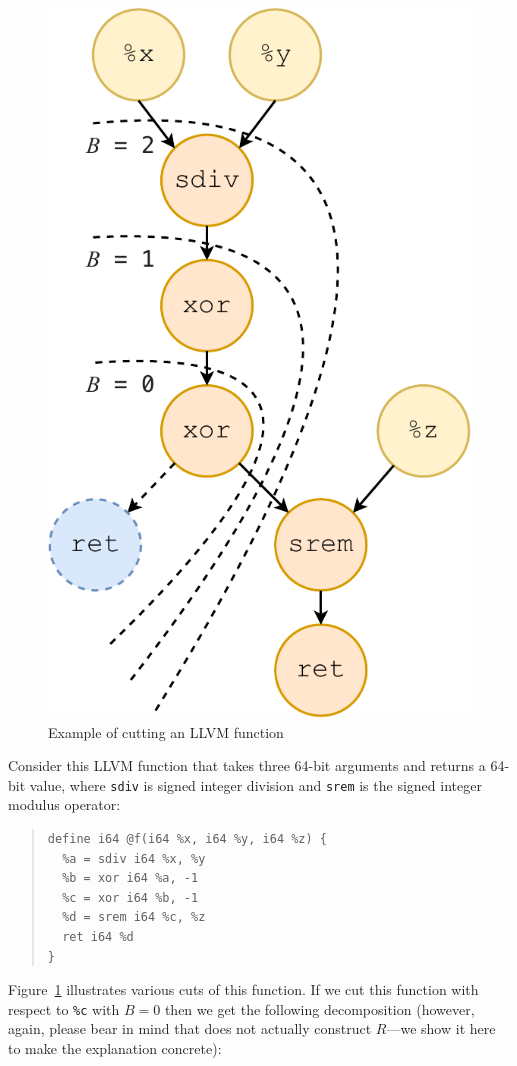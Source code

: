 \begin{figure}[tbp]
  \centering
  \includegraphics[width=0.6\linewidth]{figures/cut-depth.pdf}
  \caption{Example of cutting an LLVM function}
  \label{fig:cut-depth}
\end{figure}

Consider this LLVM function that takes three 64-bit arguments and
returns a 64-bit value, where \texttt{sdiv} is signed integer division
and \texttt{srem} is the signed integer modulus operator:


{\small\begin{quote}
\begin{verbatim}
define i64 @f(i64 %x, i64 %y, i64 %z) {
  %a = sdiv i64 %x, %y
  %b = xor i64 %a, -1
  %c = xor i64 %b, -1
  %d = srem i64 %c, %z
  ret i64 %d
}
\end{verbatim}
\end{quote}}

Figure~\ref{fig:cut-depth} illustrates various cuts of this function.
%
If we cut this function with respect to \texttt{\%c} with $B = 0$ then
we get the following decomposition (however, again, please bear in
mind that \minotaur{} does not actually construct $R$---we show it here to
make the explanation concrete):


